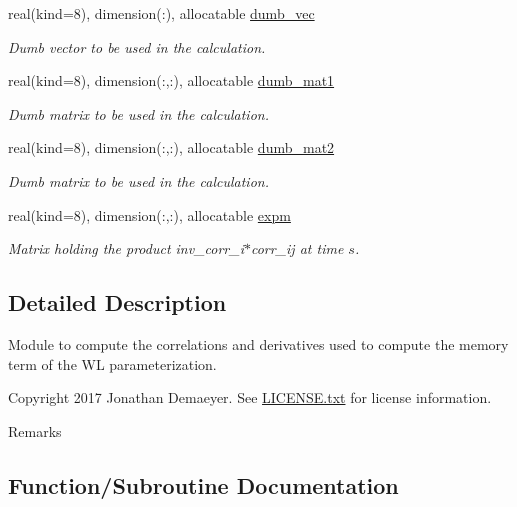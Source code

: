 \begin{DoxyCompactItemize}
real(kind=8), dimension(\+:), allocatable \hyperlink{namespacecorr__tensor_ad86b86fa1ec05686a778ab6b19273a38}{dumb\+\_\+vec}
\begin{DoxyCompactList}\small\item\em Dumb vector to be used in the calculation. \end{DoxyCompactList}\item 
real(kind=8), dimension(\+:,\+:), allocatable \hyperlink{namespacecorr__tensor_aa0f6f11b738412d93dbd832a961d6e78}{dumb\+\_\+mat1}
\begin{DoxyCompactList}\small\item\em Dumb matrix to be used in the calculation. \end{DoxyCompactList}\item 
real(kind=8), dimension(\+:,\+:), allocatable \hyperlink{namespacecorr__tensor_ad46767b09e31f58c53a5a27b12709e30}{dumb\+\_\+mat2}
\begin{DoxyCompactList}\small\item\em Dumb matrix to be used in the calculation. \end{DoxyCompactList}\item 
real(kind=8), dimension(\+:,\+:), allocatable \hyperlink{namespacecorr__tensor_acab3c2a99b90ed8bfc314f41de01e510}{expm}
\begin{DoxyCompactList}\small\item\em Matrix holding the product inv\+\_\+corr\+\_\+i$\ast$corr\+\_\+ij at time $s$. \end{DoxyCompactList}\end{DoxyCompactItemize}


\subsection{Detailed Description}
Module to compute the correlations and derivatives used to compute the memory term of the WL parameterization. 

\begin{DoxyCopyright}{Copyright}
2017 Jonathan Demaeyer. See \hyperlink{LICENSE_8txt}{L\+I\+C\+E\+N\+S\+E.\+txt} for license information. 
\end{DoxyCopyright}
\begin{DoxyRemark}{Remarks}

\end{DoxyRemark}


\subsection{Function/\+Subroutine Documentation}
